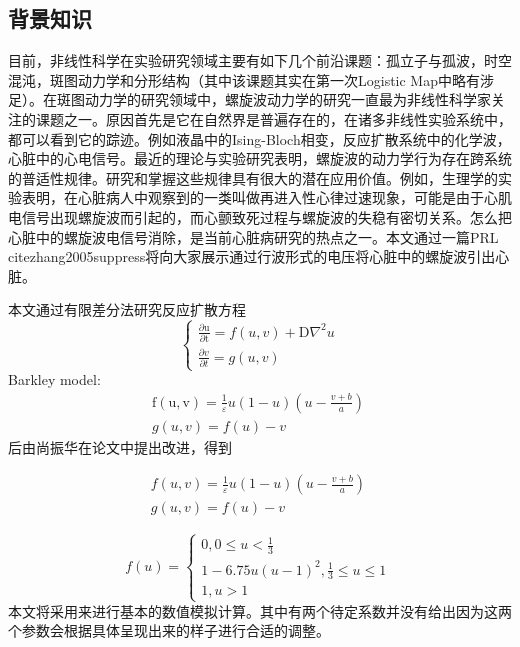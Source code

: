 

\subsection{背景知识}
目前，非线性科学在实验研究领域主要有如下几个前沿课题：孤立子与孤波，时空混沌，斑图动力学和分形结构（其中该课题其实在第一次Logistic Map中略有涉足）。在斑图动力学的研究领域中，螺旋波动力学的研究一直最为非线性科学家关注的课题之一。原因首先是它在自然界是普遍存在的，在诸多非线性实验系统中，都可以看到它的踪迹。例如液晶中的Ising-Bloch相变，反应扩散系统中的化学波，心脏中的心电信号。最近的理论与实验研究表明，螺旋波的动力学行为存在跨系统的普适性规律。研究和掌握这些规律具有很大的潜在应用价值。例如，生理学的实验表明，在心脏病人中观察到的一类叫做再进入性心律过速现象，可能是由于心肌电信号出现螺旋波而引起的，而心颤致死过程与螺旋波的失稳有密切关系。怎么把心脏中的螺旋波电信号消除，是当前心脏病研究的热点之一。本文通过一篇PRL cite{zhang2005suppress}将向大家展示通过行波形式的电压将心脏中的螺旋波引出心脏。

本文通过有限差分法研究反应扩散方程
\begin{equation}
\left\{\begin{array}{c}
\frac{\partial \mathrm{u}}{\partial \mathrm{t}}=f(u, v)+\mathrm{D} \nabla^{2} u \\
\frac{\partial v}{\partial t}=g(u, v)
\end{array}\right.
\end{equation}
Barkley model:
\begin{equation}
\begin{array}{c}
\mathrm{f}(\mathrm{u}, \mathrm{v})=\frac{1}{\varepsilon} u(1-u)\left(u-\frac{v+b}{a}\right) \\
g(u, v)=f(u)-v
\end{array}~
\end{equation}
后由尚振华在论文中提出改进，得到

\begin{equation}
\begin{array}{c}
	f(u, v)=\frac{1}{\varepsilon} u(1-u)\left(u-\frac{v+b}{a}\right)\\
	g(u, v)=f(u)-v
\end{array}~
\end{equation}

\begin{equation}
f(u)=\left\{\begin{array}{c}
0,0 \leq u<\frac{1}{3} \\
1-6.75 u(u-1)^{2}, \frac{1}{3} \leq u \leq 1 \\
1, u>1
\end{array}\right.~
\end{equation}
本文将采用来进行基本的数值模拟计算。其中有两个待定系数并没有给出因为这两个参数会根据具体呈现出来的样子进行合适的调整。
